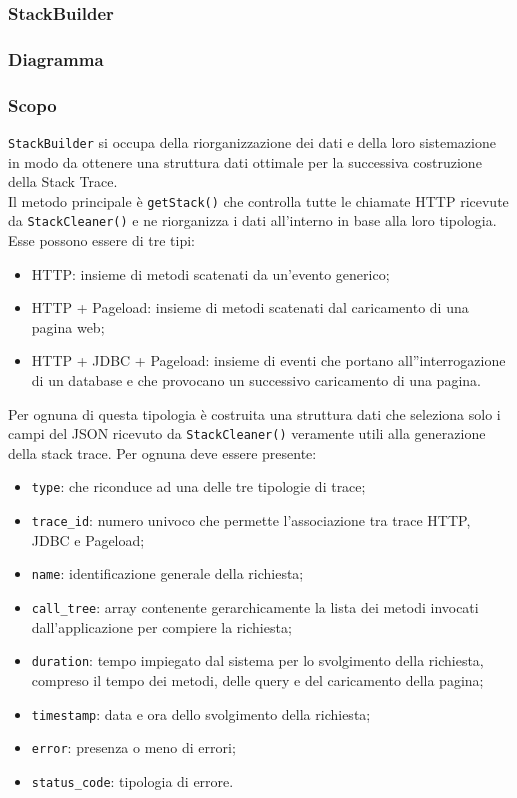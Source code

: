 \subsubsection{StackBuilder}
\label{sec:StackBuilder}
	\subsubsection{Diagramma}

	\subsubsection{Scopo}
	\texttt{StackBuilder} si occupa della riorganizzazione dei dati e della loro sistemazione in modo da ottenere una struttura dati ottimale per la successiva costruzione della Stack Trace.\\
	Il metodo principale è \texttt{getStack()} che controlla tutte le chiamate HTTP ricevute da \texttt{StackCleaner()} e ne riorganizza i dati all'interno in base alla loro tipologia. Esse possono essere di tre tipi:
	\begin{itemize}
		\item HTTP: insieme di metodi scatenati da un'evento generico;
		\item HTTP + Pageload: insieme di metodi scatenati dal caricamento di una pagina web;
		\item HTTP + JDBC + Pageload: insieme di eventi che portano all''interrogazione di un database e che provocano un successivo caricamento di una pagina.
	\end{itemize}
	Per ognuna di questa tipologia è costruita una struttura dati che seleziona solo i campi del JSON ricevuto da \texttt{StackCleaner()} veramente utili alla generazione della stack trace. Per ognuna deve essere presente:
	\begin{itemize}
		\item \texttt{type}: che riconduce ad una delle tre tipologie di trace;
		\item \texttt{trace\_id}: numero univoco che permette l'associazione tra trace HTTP, JDBC e Pageload;
		\item \texttt{name}: identificazione generale della richiesta;
		\item \texttt{call\_tree}: array contenente gerarchicamente la lista dei metodi invocati dall'applicazione per compiere la richiesta;
		\item \texttt{duration}: tempo impiegato dal sistema per lo svolgimento della richiesta, compreso il tempo dei metodi, delle query e del caricamento della pagina;
		\item \texttt{timestamp}: data e ora dello svolgimento della richiesta;
		\item \texttt{error}: presenza o meno di errori;
		\item \texttt{status\_code}: tipologia di errore.
	\end{itemize}
